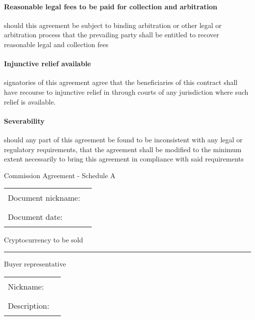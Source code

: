 \documentclass[10pt]{article}
\begin{document}
\paragraph{Reasonable legal fees to be paid for collection and
  arbitration} should this agreement be subject to binding arbitration
or other legal or arbitration process that the prevailing party shall
be entitled to recover reasonable legal and collection fees

\paragraph{Injunctive relief available} signatories of this agreement agree that the beneficiaries of this contract shall have recourse to injunctive relief in through courts of any jurisdiction where such relief is available.

\paragraph{Severability} should any part of this agreement be found to be inconsistent with any legal or regulatory requirements, that the agreement shall be modified to the minimum extent necessarily to bring this agreement in compliance with said requirements

\pagebreak
\begin{center}
{\Large Commission Agreement - Schedule A}
\end{center}

\begin{tabular}{l l}
  Document nickname: & \rule{5cm}{.2pt}\\
  Document date: & \rule{5cm}{.2pt}\\
\end{tabular}

\vspace{1cm}

\begin{center}
Cryptocurrency to be sold
\end{center}

\rule{10cm}{.2pt}

\vspace{1cm}
\begin{center}
Buyer representative
\end{center}

\begin{tabular}{l l}
Nickname: & \rule{5cm}{.2pt} \\
Description: & \rule{5cm}{.2pt} \\
\end{tabular}
\vspace{1cm}
\end{document}
